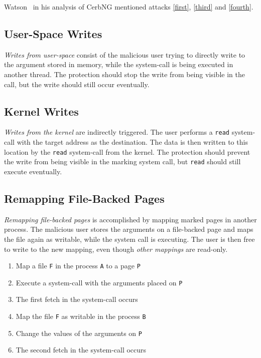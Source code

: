 \documentclass[conference]{IEEEtran}
\begin{document}
Watson~\cite{watson2007exploiting} in his analysis of CerbNG mentioned attacks
\autoref{first}, \autoref{third} and \autoref{fourth}.

\subsection{User-Space Writes}

\emph{Writes from user-space} consist of the malicious user trying to directly
write to the argument stored in memory, while the system-call is being executed
in another thread. The protection should stop the write from being visible in
the call, but the write should still occur eventually.

\subsection{Kernel Writes}

\emph{Writes from the kernel} are indirectly triggered. The user performs a
\texttt{read} system-call with the target address as the destination. The data
is then written to this location by the \texttt{read} system-call from the
kernel. The protection should prevent the write from being visible in the
marking system call, but \texttt{read} should still execute eventually.

\subsection{Remapping File-Backed Pages}

\emph{Remapping file-backed pages} is accomplished by mapping marked pages in
another process. The malicious user stores the arguments on a file-backed page
and maps the file again as writable, while the system call is executing. The
user is then free to write to the new mapping, even though \emph{other mappings}
are read-only.

\begin{enumerate}
  \item Map a file \texttt{F} in the process \texttt{A} to a page \texttt{P}
  \item Execute a system-call with the arguments placed on \texttt{P}
  \item The first fetch in the system-call occurs
  \item Map the file \texttt{F} as writable in the process \texttt{B}
  \item Change the values of the arguments on \texttt{P}
  \item The second fetch in the system-call occurs
\end{enumerate}
\end{document}
